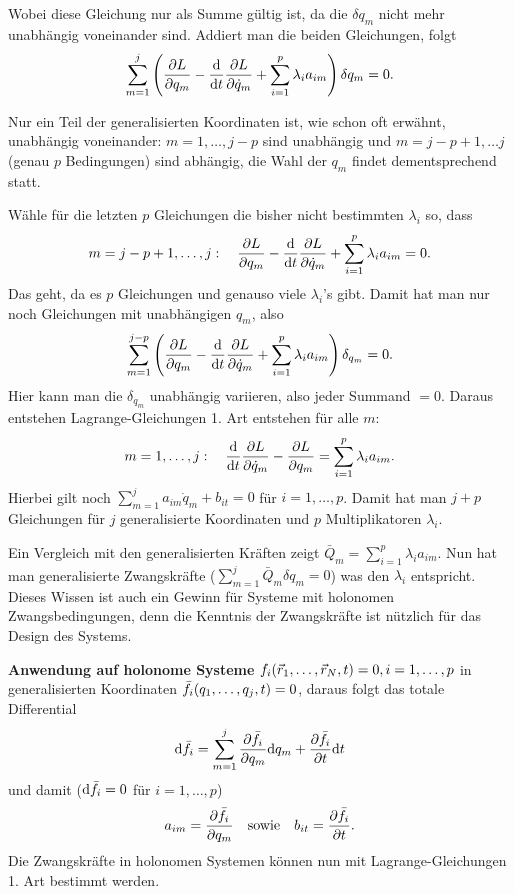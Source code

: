 Wobei diese Gleichung nur als Summe gültig ist, da die $\delta q_m$ nicht mehr unabhängig voneinander sind. Addiert man die beiden Gleichungen, folgt
\[
	\sum_{m=1}^j \left( \frac{\partial L}{\partial q_m} - \frac{\mathrm d}{\mathrm d t} \frac{\partial L}{\partial \dot{q}_m} + \sum_{i=1}^p \lambda_i a_{im} \right) \delta q_m = 0
	\text{.}
\]

Nur ein Teil der generalisierten Koordinaten ist, wie schon oft erwähnt, unabhängig voneinander: $m = 1, \dots, j - p$ sind unabhängig und $m = j - p + 1, \dots j$ (genau $p$ Bedingungen) sind abhängig, die Wahl der $q_m$ findet dementsprechend statt.

Wähle für die letzten $p$ Gleichungen die bisher nicht bestimmten $\lambda_i$ so, dass
\[
	m = j-p+1, \dots, j: 
	\quad 
	\frac{\partial L}{\partial q_m} - \frac{\mathrm d}{\mathrm d t} \frac{\partial L}{\partial \dot{q}_m} + \sum_{i=1}^p \lambda_i a_{im} = 0
	\text{.}
\]
Das geht, da es $p$ Gleichungen und genauso viele $\lambda_i$'s gibt. Damit hat man nur noch Gleichungen mit unabhängigen $q_m$, also
\[
	\sum^{j - p}_{m = 1} \left( \frac{\partial L}{\partial q_m} - \frac{\mathrm d}{\mathrm d t} \frac{\partial L}{\partial \dot{q}_m} + \sum^p_{i = 1} \lambda_i a_{im} \right) \delta_{q_m} = 0
	\text{.}
\]
Hier kann man die $\delta_{q_m}$ unabhängig variieren, also jeder Summand $=0$. Daraus entstehen Lagrange-Gleichungen 1. Art entstehen für alle $m$:
\[
	m = 1, \dots, j:
	\quad
	\frac{\mathrm d}{\mathrm d t} \frac{\partial L}{\partial \dot{q}_m} - \frac{\partial L}{\partial q_m} = \sum_{i=1}^p \lambda_i a_{im}
	\text{.}
\]
Hierbei gilt noch $\sum_{m=1}^j a_{im} \dot{q}_m + b_{it} = 0$ für $i = 1, \dots, p$. Damit hat man $j + p$ Gleichungen für $j$ generalisierte Koordinaten und $p$ Multiplikatoren $\lambda_i$.

Ein Vergleich mit den generalisierten Kräften zeigt $\bar{Q}_m = \sum_{i=1}^{p} \lambda_i a_{im}$.
Nun hat man generalisierte Zwangskräfte ($\sum_{m=1}^j \bar{Q}_m \delta q_m = 0$) was den $\lambda_i$ entspricht.
Dieses Wissen ist auch ein Gewinn für Systeme mit holonomen Zwangsbedingungen, denn die Kenntnis der Zwangskräfte ist nützlich für das Design des Systems.

\textbf{Anwendung auf holonome Systeme}
$f_i(\vec{r}_1, \dots, \vec{r}_N, t) = 0, i = 1, \dots, p$ in generalisierten Koordinaten $\bar{f}_i(q_1, \dots, q_j, t) = 0$, daraus folgt das totale Differential 
\[
	\mathrm d \bar{f}_i = \sum_{m=1}^j \frac{\partial \bar{f}_i}{\partial q_m} \mathrm d q_m + \frac{\partial \bar{f}_i}{\partial t} \mathrm d t
\]
und damit ($\mathrm d \bar{f}_i = 0$ für $i = 1, \dots, p$)
\[
	a_{im} = \frac{\partial \bar{f}_i}{\partial q_m}
	\quad \text{sowie} \quad
	b_{it} = \frac{\partial \bar{f}_i}{\partial t}
	\text{.}
\]
Die Zwangskräfte in holonomen Systemen können nun mit Lagrange-Gleichungen 1. Art bestimmt werden.


